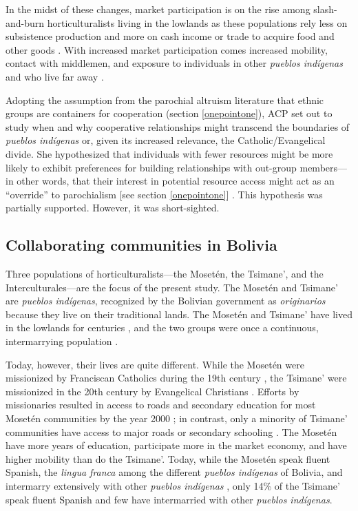 \documentclass[bibauthoryear]{aa}
\begin{document}
In the midst of these changes, market participation is on the rise among slash-and-burn horticulturalists living in the lowlands as these populations rely less on subsistence production and more on cash income or trade to acquire food and other goods \citep{gurven2015does, reyes2010integration}. With increased market participation comes increased mobility, contact with middlemen, and exposure to individuals in other \textit{pueblos ind\'igenas} and who live far away \citep{pisorjones2020}.

 Adopting the assumption from the parochial altruism literature that ethnic groups are containers for cooperation (section \ref{onepointone}), ACP set out to study when and why cooperative relationships might transcend the boundaries of \textit{pueblos ind\'igenas} or, given its increased relevance, the Catholic/Evangelical divide. She hypothesized that individuals with fewer resources might be more likely to exhibit preferences for building relationships with out-group members---in other words, that their interest in potential resource access might act as an ``override'' to parochialism [see section \ref{onepointone}] \citep{pisor2016risk, pisor2018diversify}. This hypothesis was partially supported. However, it was short-sighted.

\subsection{Collaborating communities in Bolivia}\label{pops2}
Three populations of horticulturalists---the Moset\'en, the Tsimane’, and the Interculturales---are the focus of the present study. The Moset\'en and Tsimane’ are \textit{pueblos ind\'igenas}, recognized by the Bolivian government as \textit{originarios} because they live on their traditional lands. The Moset\'en and Tsimane’ have lived in the lowlands for centuries  \citep{godoy2015natural, tomas2008tsimane}, and the two groups were once a continuous, intermarrying population \citep{bert2001major, godoy2015natural, gurven2007mortality, sakel2011moseten, ringhofer2010exploring}. 

Today, however, their lives are quite different. While the Moset\'en were missionized by Franciscan Catholics during the 19th century \citep{godoy2015natural, mamani2010tsinsi, ref947717999}, the Tsimane' were missionized in the 20th century by Evangelical Christians \citep{tomas2008tsimane}. Efforts by missionaries resulted in access to roads and secondary education for most Moset\'en communities by the year 2000 \citep{pisor2018diversify}; in contrast,  only a minority of Tsimane' communities have access to major roads or secondary schooling \citep{ringhofer2010exploring}. 
The Moset\'en have more years of education, participate more in the market economy, and have higher mobility than do the Tsimane'. Today, while the Moset\'en speak fluent Spanish, the \textit{lingua franca} among the different \textit{pueblos ind\'igenas} of Bolivia, and intermarry extensively with other \textit{pueblos ind\'igenas} \citep{pisor2018diversify}, only 14\% of the Tsimane' speak fluent Spanish \citep{pisor2016risk} and few have intermarried with other \textit{pueblos ind\'igenas}.
\end{document}
